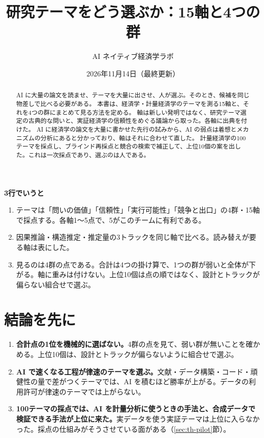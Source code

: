 \documentclass[a4paper,10pt]{ltjsarticle}
\title{研究テーマをどう選ぶか：15軸と4つの群}
\author{AI ネイティブ経済学ラボ}
\date{2026年11月14日（最終更新）}
\begin{document}
\maketitle

\begin{abstract}
AI に大量の論文を読ませ、テーマを大量に出させ、人が選ぶ。そのとき、候補を同じ物差しで比べる必要がある。
本書は、経済学・計量経済学のテーマを測る15軸と、それを4つの群にまとめて見る方法を定める。
軸は新しい発明ではなく、研究テーマ選定の古典的な問いと、実証経済学の信頼性をめぐる議論から取った。各軸に出典を付けた。
AI に経済学の論文を大量に書かせた先行の試みから、AI の弱点は着想とメカニズムの分析にあると分かっており、軸はそれに合わせて直した。
計量経済学の100テーマを採点し、ブラインド再採点と競合の検索で補正して、上位10個の案を出した。これは一次採点であり、選ぶのは人である。
\end{abstract}

\begin{chaptermap}
\textbf{3行でいうと}
\begin{enumerate}[leftmargin=*]
  \item テーマは「問いの価値」「信頼性」「実行可能性」「競争と出口」の4群・15軸で採点する。各軸1〜5点で、5がこのチームに有利である。
  \item 因果推論・構造推定・推定量の3トラックを同じ軸で比べる。読み替えが要る軸は表にした。
  \item 見るのは4群の点である。合計は4つの掛け算で、1つの群が弱いと全体が下がる。軸に重みは付けない。上位10個は点の順ではなく、設計とトラックが偏らない組合せで選ぶ。
\end{enumerate}
\end{chaptermap}

\section{結論を先に}\label{sec:th-answer}

\begin{keypoint}
\begin{enumerate}[leftmargin=*]
  \item \textbf{合計点の1位を機械的に選ばない。}4群の点を見て、弱い群が無いことを確かめる。上位10個は、設計とトラックが偏らないように組合せで選ぶ。
  \item \textbf{AI で速くなる工程が律速のテーマを選ぶ。}文献・データ構築・コード・頑健性の量で差がつくテーマでは、AI を積むほど勝率が上がる。データの利用許可が律速のテーマでは上がらない。
  \item \textbf{100テーマの採点では、AI を計量分析に使うときの手法と、合成データで検証できる手法が上位に来た。}実データを使う実証テーマは上位に入らなかった。採点の仕組みがそうさせている面がある（\ref{sec:th-pilot}節）。
\end{enumerate}
\end{keypoint}
\end{document}
